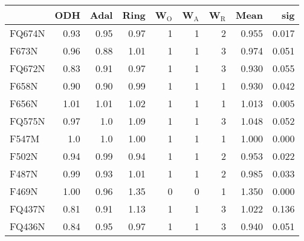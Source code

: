 \begin{tabular}{lrrrrrrrr}
 & ODH & Adal & Ring & W$_{\text{O}}$ & W$_{\text{A}}$ & W$_{\text{R}}$ & Mean & sig \\
\hline
FQ674N & 0.93 & 0.95 & 0.97 & 1 & 1 & 2 & 0.955 & 0.017 \\
F673N & 0.96 & 0.88 & 1.01 & 1 & 1 & 3 & 0.974 & 0.051 \\
FQ672N & 0.83 & 0.91 & 0.97 & 1 & 1 & 3 & 0.930 & 0.055 \\
F658N & 0.90 & 0.90 & 0.99 & 1 & 1 & 1 & 0.930 & 0.042 \\
F656N & 1.01 & 1.01 & 1.02 & 1 & 1 & 1 & 1.013 & 0.005 \\
FQ575N & 0.97 & 1.0 & 1.09 & 1 & 1 & 3 & 1.048 & 0.052 \\
F547M & 1.0 & 1.0 & 1.00 & 1 & 1 & 1 & 1.000 & 0.000 \\
F502N & 0.94 & 0.99 & 0.94 & 1 & 1 & 2 & 0.953 & 0.022 \\
F487N & 0.99 & 0.93 & 1.01 & 1 & 1 & 2 & 0.985 & 0.033 \\
F469N & 1.00 & 0.96 & 1.35 & 0 & 0 & 1 & 1.350 & 0.000 \\
FQ437N & 0.81 & 0.91 & 1.13 & 1 & 1 & 3 & 1.022 & 0.136 \\
FQ436N & 0.84 & 0.95 & 0.97 & 1 & 1 & 3 & 0.940 & 0.051 \\
\end{tabular}
